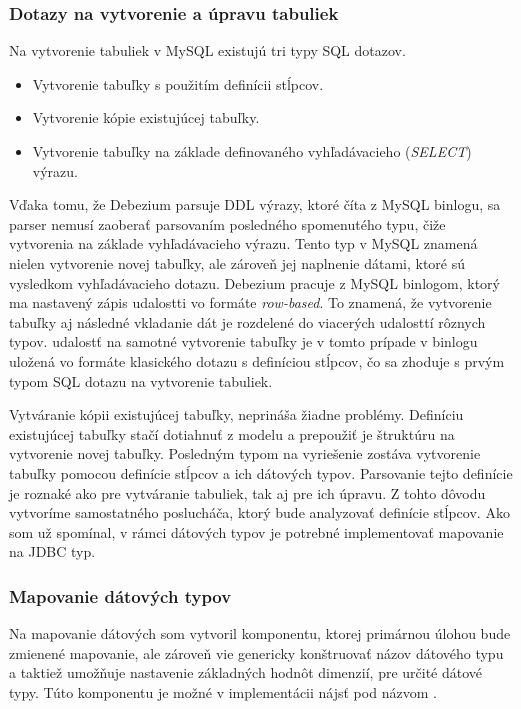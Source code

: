 \subsubsection{Dotazy na vytvorenie a úpravu tabuliek}\label{createAlterTable}
Na vytvorenie tabuliek v MySQL existujú tri typy SQL dotazov. 
\begin{itemize}
\item Vytvorenie tabuľky s použitím definícii stĺpcov.
\item Vytvorenie kópie existujúcej tabuľky.
\item Vytvorenie tabuľky na základe definovaného vyhľadávacieho (\textit{SELECT}) výrazu.
\end{itemize}

Vďaka tomu, že Debezium parsuje DDL výrazy, ktoré číta z MySQL binlogu, sa parser nemusí zaoberať parsovaním posledného spomenutého typu, čiže vytvorenia na základe vyhľadávacieho výrazu. Tento typ v MySQL znamená nielen vytvorenie novej tabuľky, ale zároveň jej naplnenie dátami, ktoré sú vysledkom vyhľadávacieho dotazu. Debezium pracuje z MySQL binlogom, ktorý ma nastavený zápis udalostti vo formáte \textit{row-based}. To znamená, že vytvorenie tabuľky aj následné vkladanie dát je rozdelené do viacerých udalosttí rôznych typov. udalostť na samotné vytvorenie tabuľky je v tomto prípade v binlogu uložená vo formáte klasického dotazu s definíciou stĺpcov, čo sa zhoduje s prvým typom SQL dotazu na vytvorenie tabuliek.

Vytváranie kópii existujúcej tabuľky, neprináša žiadne problémy. Definíciu existujúcej tabuľky stačí dotiahnuť z modelu a prepoužiť je štruktúru na vytvorenie novej tabuľky. Posledným typom na vyriešenie zostáva vytvorenie tabuľky pomocou definície stĺpcov a ich dátových typov. Parsovanie tejto definície je roznaké ako pre vytváranie tabuliek, tak aj pre ich úpravu. Z tohto dôvodu vytvoríme samostatného poslucháča, ktorý bude analyzovať definície stĺpcov. Ako som už spomínal, v rámci dátových typov je potrebné implementovať mapovanie na JDBC typ.

\subsubsection{Mapovanie dátových typov}
Na mapovanie dátových som vytvoril komponentu, ktorej primárnou úlohou bude zmienené mapovanie, ale zároveň vie genericky konštruovať názov dátového typu a taktiež umožňuje nastavenie základných hodnôt dimenzií, pre určité dátové typy. Túto komponentu je možné v implementácii nájsť pod názvom .


